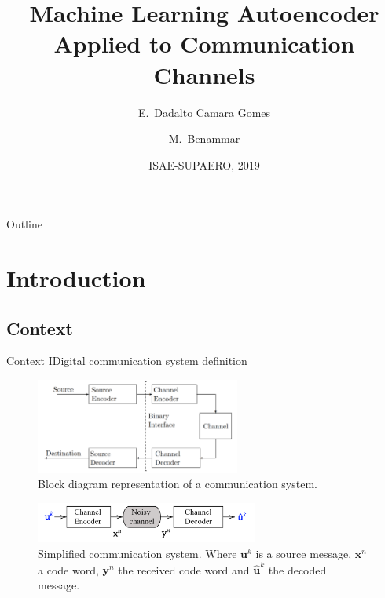 \documentclass{beamer}
\title[Machine Learning and Communication]{Machine Learning Autoencoder Applied to Communication Channels}
\author{E.~Dadalto Camara Gomes\inst{1} \and M.~Benammar\inst{2}}
\institute[] %
{
  \inst{1}%
   ISAE-SUPAERO\\
   Université de Toulouse\\
    31055, Toulouse, France\\
Email: eduardo.dadalto-camara-gomes@student.isae-supaero.fr
  \and
  \inst{2}%
  Department of Electronics, Optronics, and Signal processing\\
  ISAE-SUPAERO\\
  31055, Toulouse, France\\
  Email: meryem.benammar@isae-supaero.fr
 }
\date{ISAE-SUPAERO, 2019}
\begin{document}
\begin{frame}
  \titlepage
\end{frame}

\begin{frame}{Outline}
  \tableofcontents
\end{frame}

\section{Introduction}
\subsection{Context}
\begin{frame}{Context I}{Digital communication system definition}
  
  
\begin{figure}
  \centering
   \includegraphics[width=0.6\textwidth]{images/Communication_system_schema_from_book}
  \caption{Block diagram representation of a communication system.}%
\end{figure}   
  
\begin{figure}
  \centering
   \includegraphics[width=0.65\textwidth]{images/simple_sys}
  \caption{Simplified communication system. Where $\textbf{u}^k$ is a source message, $\textbf{x}^n$ a code word, $\textbf{y}^n$ the received code word and $\hat{\textbf{u}}^k$ the decoded message.}\label{fig:cs}
\end{figure}  
  
\end{frame}
\end{document}
